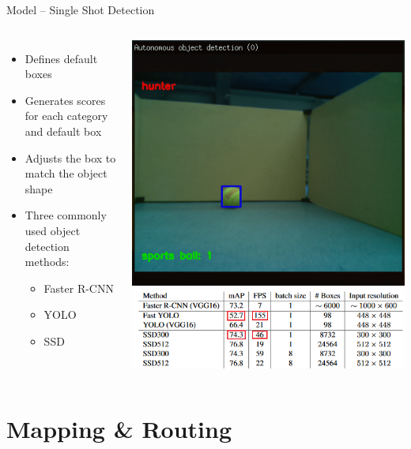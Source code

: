 \documentclass{beamer}
\begin{document}
\begin{frame}{Model – Single Shot Detection}
\begin{columns}
\begin{itemize}
\item Defines default boxes
\item Generates scores for each category and default box
\item Adjusts the box to match the object shape
\vspace{5mm}
\item Three commonly used object detection methods:
	\begin{itemize}
	\item Faster R-CNN
	\item YOLO
	\item SSD
	\end{itemize}
\end{itemize}
\hfill \includegraphics[scale=0.35]{sources/ss.png}
\includegraphics[scale=0.4]{sources/tempsnip.png}
\end{columns}
\end{frame}

\section{Mapping \& Routing}
\end{document}
